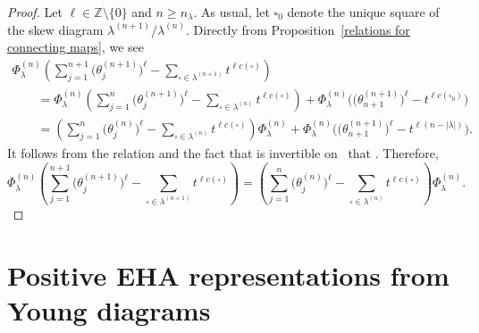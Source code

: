 \documentclass[pdftex]{sigma}
\numberwithin{equation}{section}
\theoremstyle{definition}
\begin{document}
\begin{proof}
 Let $\ell \in \mathbb{Z}\setminus \{0\}$ and $n \geq n_{\lambda}$. As usual, let $\square_0$ denote the unique square of the skew diagram $\lambda^{(n+1)}/\lambda^{(n)}$. Directly from Proposition~\ref{relations for connecting maps}, we see
 \begin{gather*}
 \Phi^{(n)}_{\lambda}\left( \sum_{j=1}^{n+1}\bigl(\theta^{(n+1)}_j\bigr)^{\ell} - \sum_{\square \in \lambda^{(n+1)}} t^{\ell c(\square)} \right) \\
 \qquad = \Phi^{(n)}_{\lambda}\left( \sum_{j=1}^{n}\bigl(\theta^{(n+1)}_j\bigr)^{\ell} - \sum_{\square \in \lambda^{(n)}} t^{\ell c(\square)} \right) + \Phi^{(n)}_{\lambda}\bigl(\bigl(\theta^{(n+1)}_{n+1}\bigr)^{\ell} - t^{\ell c(\square_0)}\bigr) \\
 \qquad = \left( \sum_{j=1}^{n}\bigl(\theta^{(n)}_j\bigr)^{\ell} - \sum_{\square \in \lambda^{(n)}} t^{\ell c(\square)} \right)\Phi^{(n)}_{\lambda} + \Phi^{(n)}_{\lambda}\bigl(\bigl(\theta^{(n+1)}_{n+1}\bigr)^{\ell} - t^{\ell (n-|\lambda|)}\bigr).
 \end{gather*}
 It follows from the relation  and the fact that  is invertible on~ that
 .
 Therefore,
 \[
 \Phi^{(n)}_{\lambda}\left( \sum_{j=1}^{n+1}\bigl(\theta^{(n+1)}_j\bigr)^{\ell} - \sum_{\square \in \lambda^{(n+1)}} t^{\ell c(\square)} \right) =\left( \sum_{j=1}^{n}\bigl(\theta^{(n)}_j\bigr)^{\ell} - \sum_{\square \in \lambda^{(n)}} t^{\ell c(\square)} \right)\Phi^{(n)}_{\lambda}.\tag*{\qed}
 \]\renewcommand{\qed}{}
\end{proof}

\section{Positive EHA representations from Young diagrams}\label{Positive EHA Representations from Young Diagrams}
\end{document}
